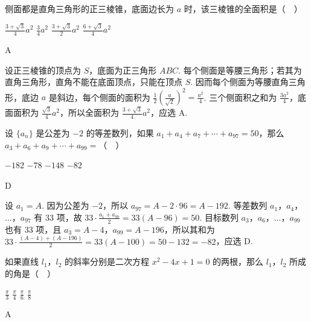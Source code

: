 \begin{problem}
侧面都是直角三角形的正三棱锥，底面边长为 \(a\) 时，该三棱锥的全面积是（\(\quad\)）

\choices
    {\(\frac{3+\sqrt{3}}{4}a^2\)}
    {\(\frac{3}{4}a^2\)}
    {\(\frac{3+\sqrt{3}}{2}a^2\)}
    {\(\frac{6+\sqrt{3}}{4}a^2\)}
\end{problem}

\begin{answer}
A
\end{answer}

\begin{solution}
设正三棱锥的顶点为 \(S\)，底面为正三角形 \(ABC\). 每个侧面是等腰三角形；若其为直角三角形，直角不能在底面顶点，只能在顶点 \(S\). 因而每个侧面为等腰直角三角形，底边 \(a\) 是斜边，每个侧面的面积为 \(\frac12\left(\frac{a}{\sqrt2}\right)^2=\frac{a^2}{4}\). 三个侧面积之和为 \(\frac{3a^2}{4}\)，底面面积为 \(\frac{\sqrt3}{4}a^2\)，所以全面积为 \(\frac{3+\sqrt3}{4}a^2\)，应选 A.
\end{solution}

\begin{problem}
设 \(\{a_n\}\) 是公差为 \(-2\) 的等差数列，如果 \(a_1+a_4+a_7+\cdots+a_{97}=50\)，那么 \(a_3+a_6+a_9+\cdots+a_{99}=\)（\(\quad\)）

\choices
    {\(-182\)}
    {\(-78\)}
    {\(-148\)}
    {\(-82\)}
\end{problem}

\begin{answer}
D
\end{answer}

\begin{solution}
设 \(a_1=A\). 因为公差为 \(-2\)，所以
\(a_{97}=A-2\cdot96=A-192\). 等差数列 \(a_1\)，\(a_4\)，\(\ldots\)，\(a_{97}\) 有 \(33\) 项，故
\(33\cdot\frac{a_1+a_{97}}2=33(A-96)=50\).
目标数列 \(a_3\)，\(a_6\)，\(\ldots\)，\(a_{99}\) 也有 \(33\) 项，且 \(a_3=A-4\)，\(a_{99}=A-196\)，所以其和为
\(33\cdot\frac{(A-4)+(A-196)}2=33(A-100)=50-132=-82\)，应选 D.
\end{solution}

\begin{problem}
如果直线 \(l_1\)，\(l_2\) 的斜率分别是二次方程 \(x^2-4x+1=0\) 的两根，那么 \(l_1\)，\(l_2\) 所成的角是（\(\quad\)）

\choices
    {\(\frac{\pi}{3}\)}
    {\(\frac{\pi}{4}\)}
    {\(\frac{\pi}{6}\)}
    {\(\frac{\pi}{8}\)}
\end{problem}

\begin{answer}
A
\end{answer}

